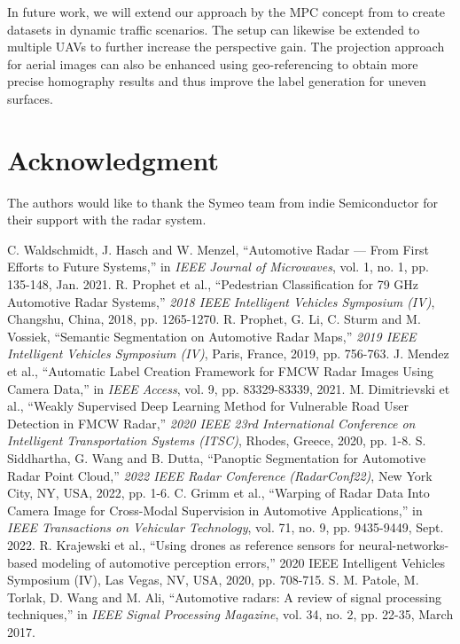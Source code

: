 \documentclass[conference]{IEEEtran}
\begin{document}
In future work, we will extend our approach by the MPC concept from \cite{b21} to create datasets in dynamic traffic scenarios.
The setup can likewise be extended to multiple UAVs to further increase the perspective gain.
The projection approach for aerial images can also be enhanced using geo-referencing to obtain more precise homography results and thus improve the label generation for uneven surfaces. 

%
%
\section*{Acknowledgment}
The authors would like to thank the Symeo team from indie Semiconductor for their support with the radar system.


\begin{thebibliography}{00}
 C. Waldschmidt, J. Hasch and W. Menzel, ``Automotive Radar — From First Efforts to Future Systems,'' in \textit{IEEE Journal of Microwaves}, vol. 1, no. 1, pp. 135-148, Jan. 2021.
 R. Prophet et al., ``Pedestrian Classification for 79 GHz Automotive Radar Systems,'' \textit{2018 IEEE Intelligent Vehicles Symposium (IV)}, Changshu, China, 2018, pp. 1265-1270.
 R. Prophet, G. Li, C. Sturm and M. Vossiek, ``Semantic Segmentation on Automotive Radar Maps,'' \textit{2019 IEEE Intelligent Vehicles Symposium (IV)}, Paris, France, 2019, pp. 756-763.
 J. Mendez et al., ``Automatic Label Creation Framework for FMCW Radar Images Using Camera Data,'' in \textit{IEEE Access}, vol. 9, pp. 83329-83339, 2021.
 M. Dimitrievski et al., ``Weakly Supervised Deep Learning Method for Vulnerable Road User Detection in FMCW Radar,'' \textit{2020 IEEE 23rd International Conference on Intelligent Transportation Systems (ITSC)}, Rhodes, Greece, 2020, pp. 1-8.
 S. Siddhartha, G. Wang and B. Dutta, ``Panoptic Segmentation for Automotive Radar Point Cloud,'' \textit{2022 IEEE Radar Conference (RadarConf22)}, New York City, NY, USA, 2022, pp. 1-6.
 C. Grimm et al., ``Warping of Radar Data Into Camera Image for Cross-Modal Supervision in Automotive Applications,'' in \textit{IEEE Transactions on Vehicular Technology}, vol. 71, no. 9, pp. 9435-9449, Sept. 2022.
 R. Krajewski et al., ``Using drones as reference sensors for neural-networks-based modeling of automotive perception errors,'' 2020 IEEE Intelligent Vehicles Symposium (IV), Las Vegas, NV, USA, 2020, pp. 708-715.
 S. M. Patole, M. Torlak, D. Wang and M. Ali, ``Automotive radars: A review of signal processing techniques,'' in \textit{IEEE Signal Processing Magazine}, vol. 34, no. 2, pp. 22-35, March 2017.

\end{thebibliography}
\end{document}
